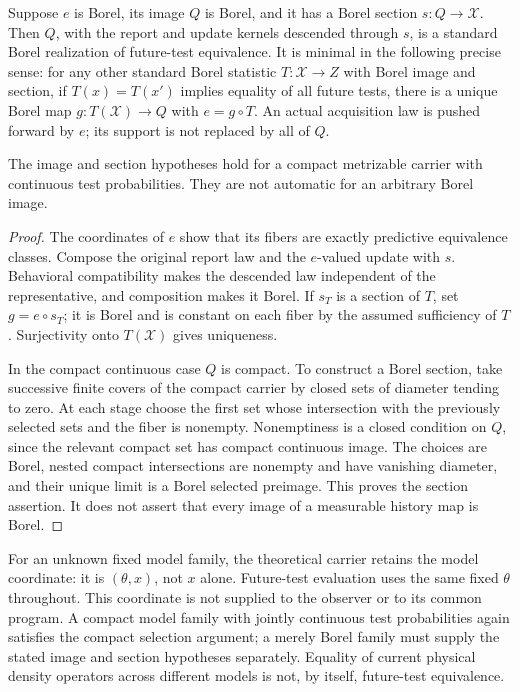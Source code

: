 \begin{proposition}\label{prop:quotient}
Suppose $e$ is Borel, its image $Q$ is Borel, and it has a Borel section $s:Q\to\mathcal X$. Then $Q$, with the report and update kernels descended through $s$, is a standard Borel realization of future-test equivalence. It is minimal in the following precise sense: for any other standard Borel statistic $T:\mathcal X\to Z$ with Borel image and section, if $T(x)=T(x')$ implies equality of all future tests, there is a unique Borel map $g:T(\mathcal X)\to Q$ with $e=g\circ T$. An actual acquisition law is pushed forward by $e$; its support is not replaced by all of $Q$.

The image and section hypotheses hold for a compact metrizable carrier with continuous test probabilities. They are not automatic for an arbitrary Borel image.
\end{proposition}
\begin{proof}
The coordinates of $e$ show that its fibers are exactly predictive equivalence classes. Compose the original report law and the $e$-valued update with $s$. Behavioral compatibility makes the descended law independent of the representative, and composition makes it Borel. If $s_T$ is a section of $T$, set $g=e\circ s_T$; it is Borel and is constant on each fiber by the assumed sufficiency of $T$. Surjectivity onto $T(\mathcal X)$ gives uniqueness.

In the compact continuous case $Q$ is compact. To construct a Borel section, take successive finite covers of the compact carrier by closed sets of diameter tending to zero. At each stage choose the first set whose intersection with the previously selected sets and the fiber is nonempty. Nonemptiness is a closed condition on $Q$, since the relevant compact set has compact continuous image. The choices are Borel, nested compact intersections are nonempty and have vanishing diameter, and their unique limit is a Borel selected preimage. This proves the section assertion. It does not assert that every image of a measurable history map is Borel.
\end{proof}

For an unknown fixed model family, the theoretical carrier retains the model coordinate: it is $(\theta,x)$, not $x$ alone. Future-test evaluation uses the same fixed $\theta$ throughout. This coordinate is not supplied to the observer or to its common program. A compact model family with jointly continuous test probabilities again satisfies the compact selection argument; a merely Borel family must supply the stated image and section hypotheses separately. Equality of current physical density operators across different models is not, by itself, future-test equivalence.

